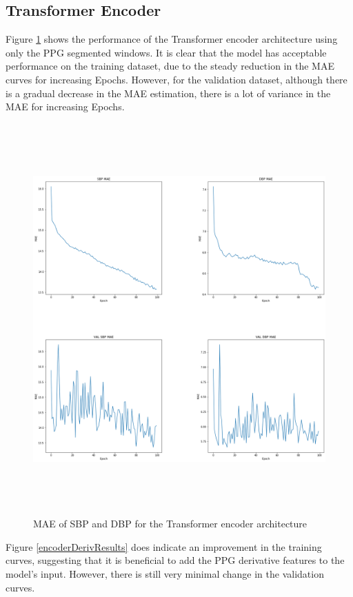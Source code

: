 \subsection{Transformer Encoder}
Figure \ref{encoderResults} shows the performance of the Transformer encoder architecture using only the PPG segmented windows. 
It is clear that the model has acceptable performance on the training dataset, due to the steady reduction in the MAE curves 
for increasing Epochs. However, for the validation dataset, although there is a gradual decrease in the MAE estimation, there is a lot 
of variance in the MAE for increasing Epochs.
\begin{figure}[H]
    \centering
    \includegraphics[width=15cm,height=15cm,keepaspectratio]{Results/encoder.png}
    \caption{MAE of SBP and DBP for the Transformer encoder architecture}
    \label{encoderResults}
\end{figure}\noindent Figure \ref{encoderDerivResults} does indicate an improvement in the training curves, suggesting 
that it is beneficial to add the PPG derivative features to the model's input. However, there is still very minimal 
change in the validation curves.
